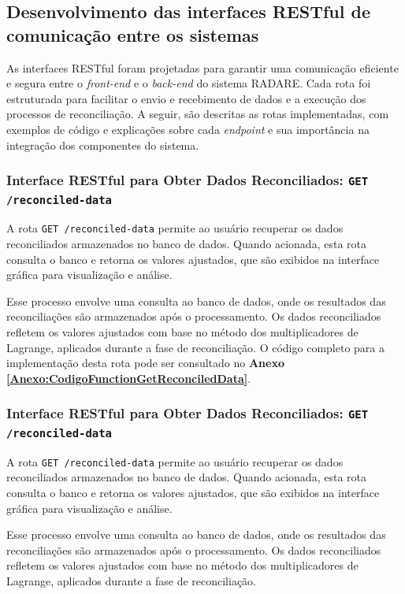 \subsection{Desenvolvimento das interfaces RESTful de comunicação entre os sistemas}

As interfaces RESTful foram projetadas para garantir uma comunicação eficiente e segura entre o \textit{front-end} e o \textit{back-end} do sistema RADARE. Cada rota foi estruturada para facilitar o envio e recebimento de dados e a execução dos processos de reconciliação. A seguir, são descritas as rotas implementadas, com exemplos de código e explicações sobre cada \textit{endpoint} e sua importância na integração dos componentes do sistema.

\subsubsection{Interface RESTful para Obter Dados Reconciliados: \texttt{GET /reconciled-data}}

A rota \texttt{GET /reconciled-data} permite ao usuário recuperar os dados reconciliados armazenados no banco de dados. Quando acionada, esta rota consulta o banco e retorna os valores ajustados, que são exibidos na interface gráfica para visualização e análise.

Esse processo envolve uma consulta ao banco de dados, onde os resultados das reconciliações são armazenados após o processamento. Os dados reconciliados refletem os valores ajustados com base no método dos multiplicadores de Lagrange, aplicados durante a fase de reconciliação. O código completo para a implementação desta rota pode ser consultado no \textbf{Anexo \ref{Anexo:CodigoFunctionGetReconciledData}}.

\subsubsection{Interface RESTful para Obter Dados Reconciliados: \texttt{GET /reconciled-data}}

A rota \texttt{GET /reconciled-data} permite ao usuário recuperar os dados reconciliados armazenados no banco de dados. Quando acionada, esta rota consulta o banco e retorna os valores ajustados, que são exibidos na interface gráfica para visualização e análise.

Esse processo envolve uma consulta ao banco de dados, onde os resultados das reconciliações são armazenados após o processamento. Os dados reconciliados refletem os valores ajustados com base no método dos multiplicadores de Lagrange, aplicados durante a fase de reconciliação.

